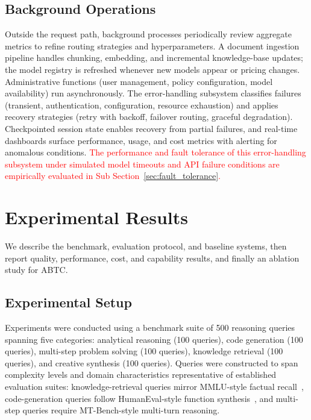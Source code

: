 \documentclass{iopjournal}
\newcommand{\rev}[1]{\textcolor{red}{#1}}
\begin{document}
\subsection{Background Operations}

Outside the request path, background processes periodically review aggregate metrics to refine routing strategies and hyperparameters. A document ingestion pipeline handles chunking, embedding, and incremental knowledge-base updates; the model registry is refreshed whenever new models appear or pricing changes. Administrative functions (user management, policy configuration, model availability) run asynchronously. The error-handling subsystem classifies failures (transient, authentication, configuration, resource exhaustion) and applies recovery strategies (retry with backoff, failover routing, graceful degradation). Checkpointed session state enables recovery from partial failures, and real-time dashboards surface performance, usage, and cost metrics with alerting for anomalous conditions. \rev{The performance and fault tolerance of this error-handling subsystem under simulated model timeouts and API failure conditions are empirically evaluated in Sub Section~\ref{sec:fault_tolerance}.}


\section{Experimental Results}
\label{sec:exp}

We describe the benchmark, evaluation protocol, and baseline systems, then report quality, performance, cost, and capability results, and finally an ablation study for ABTC.

\subsection{Experimental Setup}

Experiments were conducted using a benchmark suite of 500 reasoning
queries spanning five categories: analytical reasoning (100 queries),
code generation (100 queries), multi-step problem solving (100 queries),
knowledge retrieval (100 queries), and creative synthesis (100 queries).
Queries were constructed to span complexity levels and domain characteristics representative of established evaluation suites: knowledge-retrieval queries mirror MMLU-style factual recall~\cite{HolisticEval}, code-generation queries follow HumanEval-style function synthesis~\cite{chen2024evolution}, and multi-step queries require MT-Bench-style multi-turn reasoning.
\end{document}
